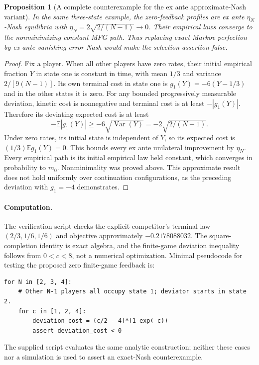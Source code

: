 \documentclass[11pt,a4paper]{article}
\newtheorem{proposition}[theorem]{Proposition}
\theoremstyle{definition}
\theoremstyle{remark}
\begin{document}
\begin{proposition}[A complete counterexample for the ex ante approximate-Nash variant]
In the same three-state example, the zero-feedback profiles are ex ante $\eta_N$-Nash equilibria with $\eta_N=2\sqrt{2/(N-1)}\to0$. Their empirical laws converge to the nonminimizing constant MFG path. Thus replacing exact Markov perfection by ex ante vanishing-error Nash would make the selection assertion false.
\end{proposition}
\begin{proof}
Fix a player. When all other players have zero rates, their initial empirical fraction $Y$ in state one is constant in time, with mean $1/3$ and variance $2/[9(N-1)]$. Its own terminal cost in state one is $g_1(Y)=-6(Y-1/3)$ and in the other states it is zero. For any bounded progressively measurable deviation, kinetic cost is nonnegative and terminal cost is at least $-|g_1(Y)|$. Therefore its deviating expected cost is at least
\[
 -\mathbb E|g_1(Y)|\geq-6\sqrt{\operatorname{Var}(Y)}
 =-2\sqrt{2/(N-1)}.
\]
Under zero rates, its initial state is independent of $Y$, so its expected cost is $(1/3)\mathbb E g_1(Y)=0$. This bounds every ex ante unilateral improvement by $\eta_N$. Every empirical path is its initial empirical law held constant, which converges in probability to $m_0$. Nonminimality was proved above. This approximate result does not hold uniformly over continuation configurations, as the preceding deviation with $g_1=-4$ demonstrates.
\end{proof}

\paragraph{Computation.}
The verification script checks the explicit competitor's terminal law $(2/3,1/6,1/6)$ and objective approximately $-0.2178088032$. The square-completion identity is exact algebra, and the finite-game deviation inequality follows from $0<c<8$, not a numerical optimization. Minimal pseudocode for testing the proposed zero finite-game feedback is:
\begin{lstlisting}
for N in [2, 3, 4]:
    # Other N-1 players all occupy state 1; deviator starts in state 2.
    for c in [1, 2, 4]:
        deviation_cost = (c/2 - 4)*(1-exp(-c))
        assert deviation_cost < 0
\end{lstlisting}
The supplied script evaluates the same analytic construction; neither these cases nor a simulation is used to assert an exact-Nash counterexample.
\end{document}
